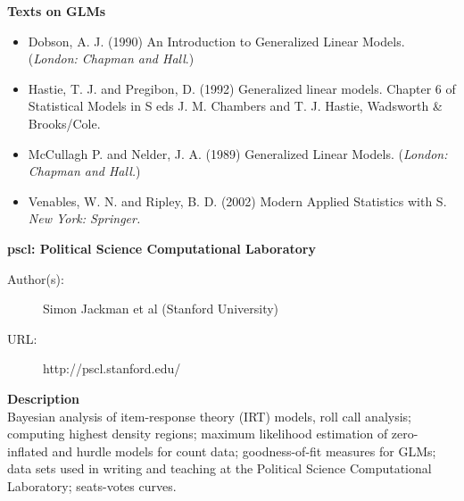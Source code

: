 \documentclass[MASTER.tex]{subfiles}
\begin{document}
\begin{frame}
	\large
	\textbf{Texts on GLMs}\\ \bigskip
\begin{itemize}
\item Dobson, A. J. (1990) An Introduction to Generalized Linear Models. (\textit{London: Chapman and Hall}.)
\bigskip
\item Hastie, T. J. and Pregibon, D. (1992) Generalized linear models. Chapter 6 of Statistical Models in S eds J. M. Chambers and T. J. Hastie, Wadsworth \& Brooks/Cole.
\bigskip
\item McCullagh P. and Nelder, J. A. (1989) Generalized Linear Models. (\textit{London: Chapman and Hall.})
\bigskip
\item Venables, W. N. and Ripley, B. D. (2002) Modern Applied Statistics with S. \textit{New York: Springer.}
\end{itemize}

\end{frame}



\begin{frame}
	\textbf{pscl: Political Science Computational Laboratory} %

\begin{description}
	\item[Author(s):] Simon Jackman et al (Stanford University)
	\item[URL:] http://pscl.stanford.edu/
\end{description}\bigskip

\textbf{Description}\\
Bayesian analysis of item-response theory (IRT) models, roll call analysis; computing highest density regions; maximum likelihood estimation of zero-inflated and hurdle models for count data; goodness-of-fit measures for GLMs; data sets used in writing and teaching at the Political Science Computational Laboratory; seats-votes curves.
\end{frame}
\end{document}
